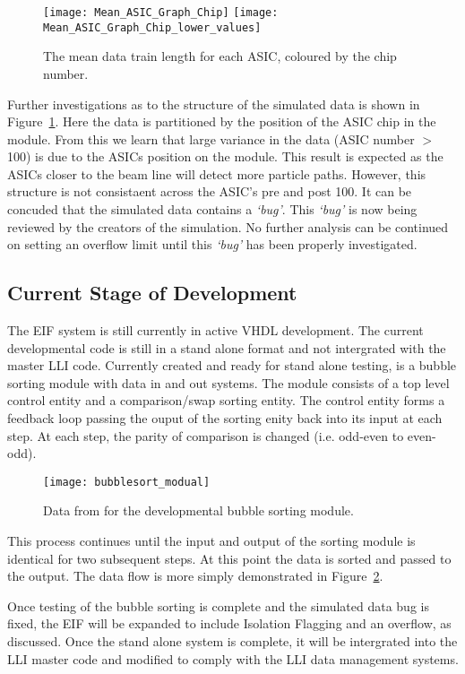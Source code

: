 		\begin{figure}[h]
			\centering
			\texttt{[image: Mean\_ASIC\_Graph\_Chip]}
			\texttt{[image: Mean\_ASIC\_Graph\_Chip\_lower\_values]}
			\caption{The mean data train length for each ASIC, coloured by the chip number.}
			\label{fig:asic_structure}
		\end{figure}\FloatBarrier
		Further investigations as to the structure of the simulated data is shown in Figure~\ref{fig:asic_structure}.
		Here the data is partitioned by the position of the ASIC chip in the module.
		From this we learn that large variance in the data (ASIC number $>$ 100) is due to the ASICs position on the module.
		This result is expected as the ASICs closer to the beam line will detect more particle paths.
		However, this structure is not consistaent across the ASIC's pre and post 100.
		It can be concuded that the simulated data contains a \textit{`bug'}.
		This \textit{`bug'} is now being reviewed by the creators of the simulation. 
		No further analysis can be continued on setting an overflow limit until this \textit{`bug'} has been properly investigated.


	\subsection{Current Stage of Development} 
		The EIF system is still currently in active VHDL development.
		The current developmental code is still in a stand alone format and not intergrated with the master LLI code.
		Currently created and ready for stand alone testing, is a bubble sorting module with data in and out systems.
		The module consists of a top level control entity and a comparison/swap sorting entity.
		The control entity forms a feedback loop passing the ouput of the sorting enity back into its input at each step.
		At each step, the parity of comparison is changed (i.e. odd-even to even-odd).
		\begin{figure}[h]
			\centering
			\texttt{[image: bubblesort\_modual]}
			\caption{Data from for the developmental bubble sorting module.}
			\label{fig:bubble_data_flow}
		\end{figure} \FloatBarrier
		\par
		This process continues until the input and output of the sorting module is identical for two subsequent steps.
		At this point the data is sorted and passed to the output.
		The data flow is more simply demonstrated in Figure~\ref{fig:bubble_data_flow}.
		\par
		Once testing of the bubble sorting is complete and the simulated data bug is fixed, the EIF will be expanded to include Isolation Flagging and an overflow, as discussed.
		Once the stand alone system is complete, it will be intergrated into the LLI master code and modified to comply with the LLI data management systems.
		\FloatBarrier